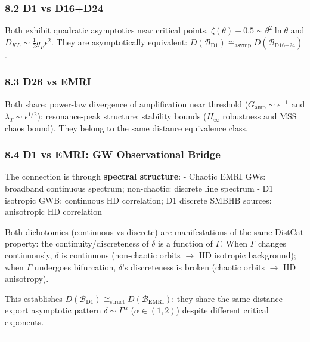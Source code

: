 \documentclass[
]{article}
\begin{document}
\subsubsection{8.2 D1 vs D16+D24}\label{d1-vs-d16d24}

Both exhibit quadratic asymptotics near critical points.
\(\zeta(\theta) - 0.5 \sim \theta^2 \ln \theta\) and
\(D_{KL} \sim \frac{1}{2} g_F \epsilon^2\). They are asymptotically
equivalent:
\(D(\mathcal{B}_{\text{D1}}) \cong_{\text{asymp}} D(\mathcal{B}_{\text{D16+24}})\).

\subsubsection{8.3 D26 vs EMRI}\label{d26-vs-emri}

Both share: power-law divergence of amplification near threshold
(\(G_{\text{amp}} \sim \epsilon^{-1}\) and
\(\lambda_T \sim \epsilon^{1/2}\)); resonance-peak structure; stability
bounds (\(H_\infty\) robustness and MSS chaos bound). They belong to the
same distance equivalence class.

\subsubsection{8.4 D1 vs EMRI: GW Observational
Bridge}\label{d1-vs-emri-gw-observational-bridge}

The connection is through \textbf{spectral structure}: - Chaotic EMRI
GWs: broadband continuous spectrum; non-chaotic: discrete line spectrum
- D1 isotropic GWB: continuous HD correlation; D1 discrete SMBHB
sources: anisotropic HD correlation

Both dichotomies (continuous vs discrete) are manifestations of the same
DistCat property: the continuity/discreteness of \(\delta\) is a
function of \(\Gamma\). When \(\Gamma\) changes continuously, \(\delta\)
is continuous (non-chaotic orbits \(\to\) HD isotropic background); when
\(\Gamma\) undergoes bifurcation, \(\delta\)'s discreteness is broken
(chaotic orbits \(\to\) HD anisotropy).

This establishes
\(D(\mathcal{B}_{\text{D1}}) \cong_{\text{struct}} D(\mathcal{B}_{\text{EMRI}})\):
they share the same distance-export asymptotic pattern
\(\delta \sim \Gamma^\alpha\) (\(\alpha \in (1, 2)\)) despite different
critical exponents.

\begin{center}\rule{0.5\linewidth}{0.5pt}\end{center}
\end{document}
